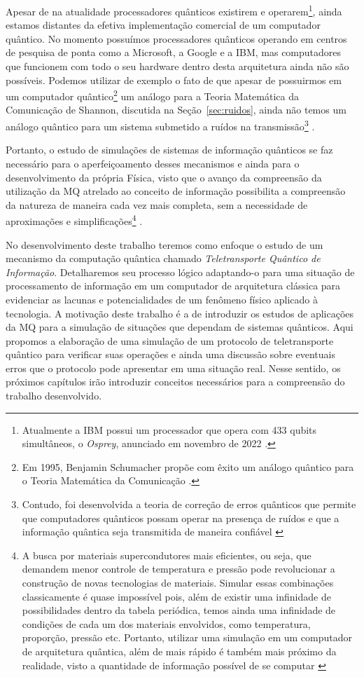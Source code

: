Apesar de na atualidade processadores quânticos existirem e operarem\footnote{Atualmente a IBM possui um processador que opera com 433 qubits simultâneos, o \textit{Osprey}, anunciado em novembro de 2022 \cite{osprey}.}, ainda estamos distantes da efetiva implementação comercial de um computador quântico. No momento possuímos processadores quânticos operando em centros de pesquisa de ponta como a Microsoft, a Google e a IBM, mas computadores que funcionem com todo o seu hardware dentro desta arquitetura ainda não são possíveis. Podemos utilizar de exemplo o fato de que apesar de possuirmos em um computador quântico\footnote{Em 1995, Benjamin Schumacher propõe com êxito um análogo quântico para o Teoria Matemática da Comunicação \cite{benschu}.} um análogo para a Teoria Matemática da Comunicação de Shannon, discutida na Seção~\ref{sec:ruidos}, ainda não temos um análogo quântico para um sistema submetido a ruídos na transmissão\footnote{Contudo, foi desenvolvida a teoria de correção de erros quânticos que permite que computadores quânticos possam operar na presença de ruídos e que a informação quântica seja transmitida de maneira confiável \cite{chuang}} \cite{chuang}.

Portanto, o estudo de simulações de sistemas de informação quânticos se faz necessário para o aperfeiçoamento desses mecanismos e ainda para o desenvolvimento da própria Física, visto que o avanço da compreensão da utilização da MQ atrelado ao conceito de informação possibilita a compreensão da natureza de maneira cada vez mais completa, sem a necessidade de aproximações e simplificações\footnote{A busca por materiais supercondutores mais eficientes, ou seja, que demandem menor controle de temperatura e pressão pode revolucionar a construção de novas tecnologias de materiais. Simular essas combinações classicamente é quase impossível pois, além de existir uma infinidade de possibilidades dentro da tabela periódica, temos ainda uma infinidade de condições de cada um dos materiais envolvidos, como temperatura, proporção, pressão etc. Portanto, utilizar uma simulação em um computador de arquitetura quântica, além de mais rápido é também mais próximo da realidade, visto a quantidade de informação possível de se computar \cite{videoyoutube}} \cite{videoyoutube}.

No desenvolvimento deste trabalho teremos como enfoque o estudo de um mecanismo da computação quântica chamado \textit{Teletransporte Quântico de Informação}. Detalharemos seu processo lógico adaptando-o para uma situação de processamento de informação em um computador de arquitetura clássica para evidenciar as lacunas e potencialidades de um fenômeno físico aplicado à tecnologia.
A motivação deste trabalho é a de introduzir os estudos de aplicações da MQ para a simulação de situações que dependam de sistemas quânticos. Aqui propomos a elaboração de uma simulação de um protocolo de teletransporte quântico para verificar suas operações e ainda uma discussão sobre eventuais erros que o protocolo pode apresentar em uma situação real. Nesse sentido, os próximos capítulos irão introduzir conceitos necessários para a compreensão do trabalho desenvolvido.
 
